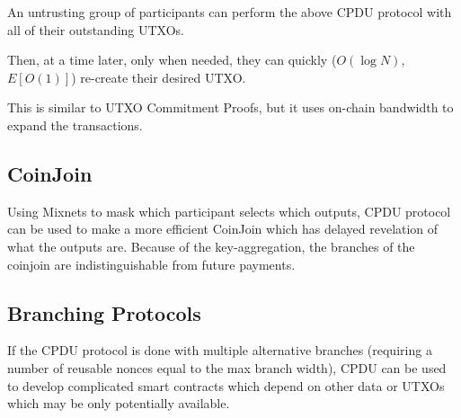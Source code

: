 \documentclass{article}
\begin{document}
An untrusting group of participants can perform the above CPDU protocol with all of their outstanding UTXOs.

Then, at a time later, only when needed, they can quickly ($O(\log N)$, $E[O(1)]$) re-create their desired UTXO.

This is similar to UTXO Commitment Proofs, but it uses on-chain bandwidth to expand the transactions.

\subsection{CoinJoin}

Using Mixnets to mask which participant selects which outputs, CPDU protocol can be used to make a more efficient CoinJoin which has delayed revelation of what the outputs are. Because of the key-aggregation, the branches of the coinjoin are indistinguishable from future payments.

\subsection{Branching Protocols}

If the CPDU protocol is done with multiple alternative branches (requiring a number of reusable nonces equal to the max branch width), CPDU can be used to develop complicated smart contracts which depend on other data or UTXOs which may be only potentially available.
\end{document}
